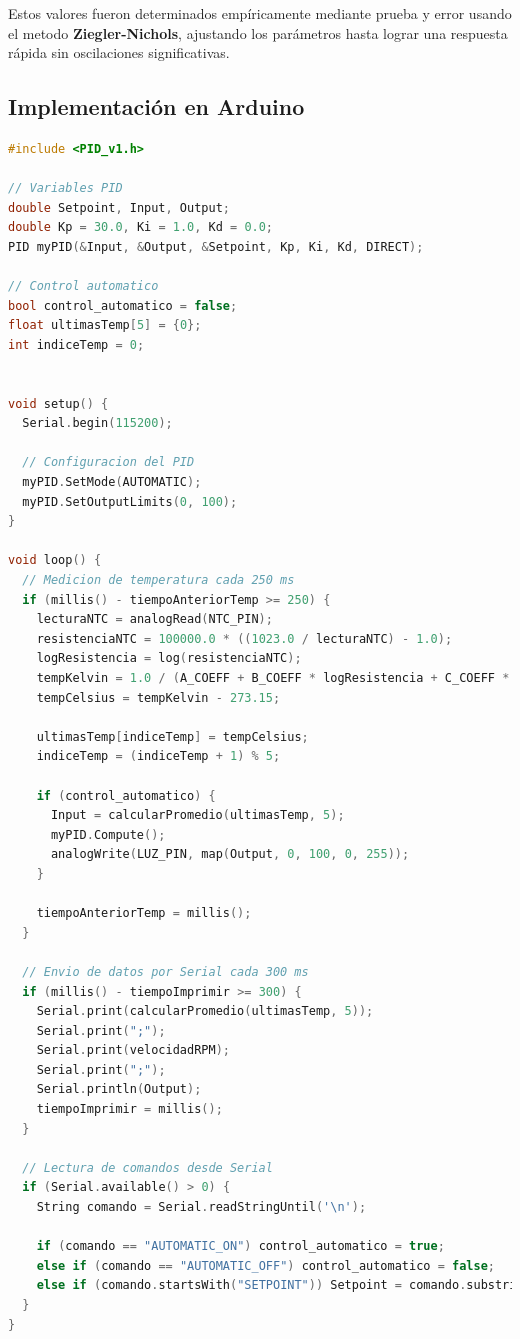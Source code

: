 \documentclass[spanish, a4paper, 11pt]{article}
\begin{document}
Estos valores fueron determinados empíricamente mediante prueba y error usando el metodo \textbf{Ziegler-Nichols}, ajustando los parámetros hasta lograr una respuesta rápida sin oscilaciones significativas.

\subsection{Implementación en Arduino}

\begin{lstlisting}[language=C++]
#include <PID_v1.h>

// Variables PID
double Setpoint, Input, Output;
double Kp = 30.0, Ki = 1.0, Kd = 0.0;
PID myPID(&Input, &Output, &Setpoint, Kp, Ki, Kd, DIRECT);

// Control automatico
bool control_automatico = false;
float ultimasTemp[5] = {0};
int indiceTemp = 0;


void setup() {
  Serial.begin(115200);

  // Configuracion del PID
  myPID.SetMode(AUTOMATIC);
  myPID.SetOutputLimits(0, 100);
}

void loop() {
  // Medicion de temperatura cada 250 ms
  if (millis() - tiempoAnteriorTemp >= 250) {
    lecturaNTC = analogRead(NTC_PIN);
    resistenciaNTC = 100000.0 * ((1023.0 / lecturaNTC) - 1.0);
    logResistencia = log(resistenciaNTC);
    tempKelvin = 1.0 / (A_COEFF + B_COEFF * logResistencia + C_COEFF * pow(logResistencia, 3));
    tempCelsius = tempKelvin - 273.15;

    ultimasTemp[indiceTemp] = tempCelsius;
    indiceTemp = (indiceTemp + 1) % 5;

    if (control_automatico) {
      Input = calcularPromedio(ultimasTemp, 5);
      myPID.Compute();
      analogWrite(LUZ_PIN, map(Output, 0, 100, 0, 255));
    }

    tiempoAnteriorTemp = millis();
  }

  // Envio de datos por Serial cada 300 ms
  if (millis() - tiempoImprimir >= 300) {
    Serial.print(calcularPromedio(ultimasTemp, 5));
    Serial.print(";");
    Serial.print(velocidadRPM);
    Serial.print(";");
    Serial.println(Output);
    tiempoImprimir = millis();
  }

  // Lectura de comandos desde Serial
  if (Serial.available() > 0) {
    String comando = Serial.readStringUntil('\n');

    if (comando == "AUTOMATIC_ON") control_automatico = true;
    else if (comando == "AUTOMATIC_OFF") control_automatico = false;
    else if (comando.startsWith("SETPOINT")) Setpoint = comando.substring(9).toDouble();
  }
}
\end{lstlisting}
\end{document}
